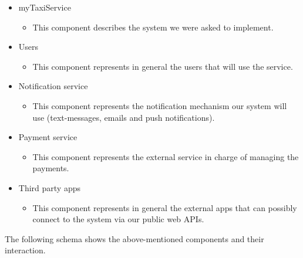 \documentclass[a4paper,11pt]{report} %
\begin{document}
	\begin{itemize}
		\item myTaxiService
			\begin{itemize}
				\item This component describes the system we were asked to implement.
			\end{itemize} 
		\item Users
			\begin{itemize}
				\item This component represents in general the users that will use the service.
			\end{itemize}
		\item Notification service
			\begin{itemize}
				\item This component represents the notification mechanism our system will use (text-messages, emails and push notifications).
			\end{itemize}
		\item Payment service
			\begin{itemize}
				\item This component represents the external service in charge of managing the payments.
			\end{itemize}
		\item Third party apps
			\begin{itemize}
				\item This component represents in general the external apps that can possibly connect to the system via our public web APIs.
			\end{itemize}
	\end{itemize}
	\hspace{2cm} The following schema shows the above-mentioned components and their interaction.\\
\end{document}
